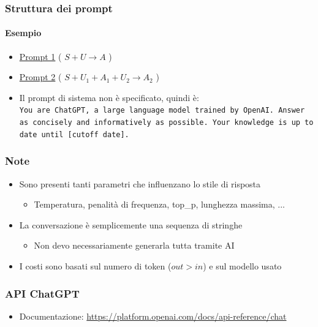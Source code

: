 \begin{exampleframe}
    \frametitle{Struttura dei prompt}
    \framesubtitle{Esempio}

    \begin{itemize}
        \item \href{https://chatgpt.com/share/6759a21f-19ec-8003-a172-e0630eae761d}{Prompt 1} ( $\boxed{S + U} \rightarrow A$ )
        \item \href{https://chatgpt.com/share/67605a8c-2fec-8003-8e82-c54f49687c1b}{Prompt 2} ( $\boxed{S + U_1 + A_1 + U_2} \rightarrow A_2$ )

        \bigskip
        \item Il prompt di sistema non è specificato, quindi è:\\
            \texttt{You are ChatGPT, a large language model trained by OpenAI. Answer as concisely and informatively as possible. Your knowledge is up to date until [cutoff date].}
    \end{itemize}
\end{exampleframe}

\begin{contentframe}
    \frametitle{Note}

    \begin{itemize}
        \item Sono presenti tanti parametri che influenzano lo stile di risposta
        \begin{itemize}
            \item Temperatura, penalità di frequenza, top\_p, lunghezza massima, ...
        \end{itemize}
    
        \bigskip
        \item La conversazione è semplicemente una sequenza di stringhe
        \begin{itemize}
            \item Non devo necessariamente generarla tutta tramite AI
        \end{itemize}

        \bigskip
        \item I costi sono basati sul numero di token ($out > in$) e sul modello usato
    \end{itemize}
\end{contentframe}

\begin{exampleframe}
    \frametitle{API ChatGPT}

    \begin{itemize}
        \item Documentazione: \url{https://platform.openai.com/docs/api-reference/chat}
    \end{itemize}
\end{exampleframe}

